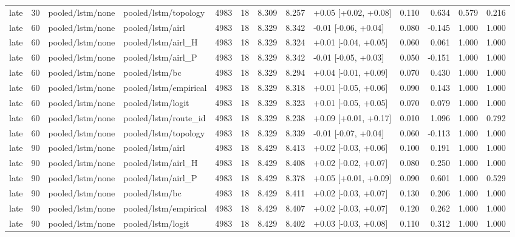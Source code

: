 \begin{tabular}{lrllrrrrlrrll}
late & 30 & pooled/lstm/none & pooled/lstm/topology & 4983 & 18 & 8.309 & 8.257 & +0.05 [+0.02, +0.08] & 0.110 & 0.634 & 0.579 & 0.216 \\
late & 60 & pooled/lstm/none & pooled/lstm/airl & 4983 & 18 & 8.329 & 8.342 & -0.01 [-0.06, +0.04] & 0.080 & -0.145 & 1.000 & 1.000 \\
late & 60 & pooled/lstm/none & pooled/lstm/airl_H & 4983 & 18 & 8.329 & 8.324 & +0.01 [-0.04, +0.05] & 0.060 & 0.061 & 1.000 & 1.000 \\
late & 60 & pooled/lstm/none & pooled/lstm/airl_P & 4983 & 18 & 8.329 & 8.342 & -0.01 [-0.05, +0.03] & 0.050 & -0.151 & 1.000 & 1.000 \\
late & 60 & pooled/lstm/none & pooled/lstm/bc & 4983 & 18 & 8.329 & 8.294 & +0.04 [-0.01, +0.09] & 0.070 & 0.430 & 1.000 & 1.000 \\
late & 60 & pooled/lstm/none & pooled/lstm/empirical & 4983 & 18 & 8.329 & 8.318 & +0.01 [-0.05, +0.06] & 0.090 & 0.143 & 1.000 & 1.000 \\
late & 60 & pooled/lstm/none & pooled/lstm/logit & 4983 & 18 & 8.329 & 8.323 & +0.01 [-0.05, +0.05] & 0.070 & 0.079 & 1.000 & 1.000 \\
late & 60 & pooled/lstm/none & pooled/lstm/route_id & 4983 & 18 & 8.329 & 8.238 & +0.09 [+0.01, +0.17] & 0.010 & 1.096 & 1.000 & 0.792 \\
late & 60 & pooled/lstm/none & pooled/lstm/topology & 4983 & 18 & 8.329 & 8.339 & -0.01 [-0.07, +0.04] & 0.060 & -0.113 & 1.000 & 1.000 \\
late & 90 & pooled/lstm/none & pooled/lstm/airl & 4983 & 18 & 8.429 & 8.413 & +0.02 [-0.03, +0.06] & 0.100 & 0.191 & 1.000 & 1.000 \\
late & 90 & pooled/lstm/none & pooled/lstm/airl_H & 4983 & 18 & 8.429 & 8.408 & +0.02 [-0.02, +0.07] & 0.080 & 0.250 & 1.000 & 1.000 \\
late & 90 & pooled/lstm/none & pooled/lstm/airl_P & 4983 & 18 & 8.429 & 8.378 & +0.05 [+0.01, +0.09] & 0.090 & 0.601 & 1.000 & 0.529 \\
late & 90 & pooled/lstm/none & pooled/lstm/bc & 4983 & 18 & 8.429 & 8.411 & +0.02 [-0.03, +0.07] & 0.130 & 0.206 & 1.000 & 1.000 \\
late & 90 & pooled/lstm/none & pooled/lstm/empirical & 4983 & 18 & 8.429 & 8.407 & +0.02 [-0.03, +0.07] & 0.120 & 0.262 & 1.000 & 1.000 \\
late & 90 & pooled/lstm/none & pooled/lstm/logit & 4983 & 18 & 8.429 & 8.402 & +0.03 [-0.03, +0.08] & 0.110 & 0.312 & 1.000 & 1.000 \\

\end{tabular}
